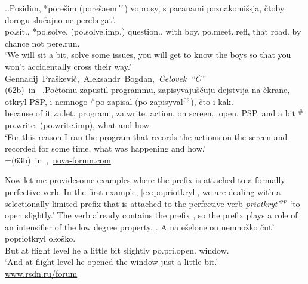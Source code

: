 \ex.\label{ex:po:Tat}\ag.\label{ex:po:Tat1}Posidim, *pore\v{s}im (\textsuperscript{\JudgeOK}pore\v{s}aem$^{\textsc{pf}}$) voprosy, s pacanami poznakomi\v{s}sja, \v{c}toby dorogu slu\v{c}ajno ne perebegat'.\\
po.sit., *po.solve. (\textsuperscript{\JudgeOK}po.solve.imp.) question., with boy. po.meet..refl, that road. {by chance} not pere.run.\\
\trans `We will sit a bit, solve some issues, you will get to know the boys so that you won't accidentally cross their way.'\\\hbox{}\hfill\hbox{Gennadij Pra\v{s}kevi\v{c}, Aleksandr Bogdan, \textit{\v{C}elovek ``\v{C}''}}\\\hbox{}\hfill\hbox{(62b) in \citet{Tatevosov:09}}
\bg.\label{ex:po:Tat2}Po\`{e}tomu zapustil programmu, zapisyvaju\v{s}\v{c}uju dejstvija na \`{e}krane, otkryl PSP, i nemnogo $^\#$po-zapisal (\textsuperscript{\JudgeOK}po-zapisyval$^{\textsc{pf}}$), \v{c}to i kak.\\
{because of it} za.let. program., za.write. action. on screen., open. PSP, and {a bit} $^\#$po.write. (\textsuperscript{\JudgeOK}po.write.imp), what and how\\
\trans `For this reason I ran the program that records the actions on the screen and recorded for some time, what was happening and how.'\\\hbox{}\hfill\hbox{=(63b) in \citet{Tatevosov:09}, \url{nova-forum.com}}

Now let me providesome examples where the  prefix  is attached to a formally perfective verb. In the first example, \ref{ex:popriotkryl}, we are dealing with a selectionally limited prefix  that is attached to the perfective verb \textit{priotkryt'}$^{\textsc{pf}}$ `to open slightly.' The  verb already contains the  prefix , so the  prefix  plays a role of an intensifier of the low degree property. 
\exg. \label{ex:popriotkryl}A na e\v{s}elone on nemno\v{z}ko \v{c}ut' popriotkryl oko\v{s}ko.\\
But at {flight level} he {a little bit} {slightly} po.pri.open. window.\\
\trans `And at flight level he opened the window just a little bit.'\\\hbox{}\hfill\hbox{\url{www.rsdn.ru/forum}}

